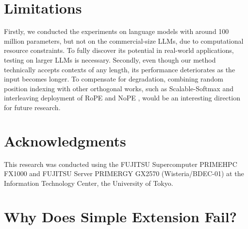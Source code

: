 \documentclass[11pt]{article}
\begin{document}
\section*{Limitations}

Firstly, we conducted the experiments on language models with around 100 million parameters, but not on the commercial-size LLMs, due to computational resource constraints. To fully discover its potential in real-world applications, testing on larger LLMs is necessary. Secondly, even though our method technically accepts contexts of any length, its performance deteriorates as the input becomes longer. To compensate for degradation, combining random position indexing with other orthogonal works, such as Scalable-Softmax \cite{nakanishi2025scalable} and interleaving deployment of RoPE and NoPE \cite{yang2025ropenopeagainnew}, would be an interesting direction for future research.



\section*{Acknowledgments}

This research was conducted using the FUJITSU Supercomputer PRIMEHPC FX1000 and FUJITSU Server PRIMERGY GX2570 (Wisteria/BDEC-01) at the Information Technology Center, the University of Tokyo.

%


\clearpage

\appendix

\section{Why Does Simple Extension Fail?}\label{sec:whyfails}
\end{document}
